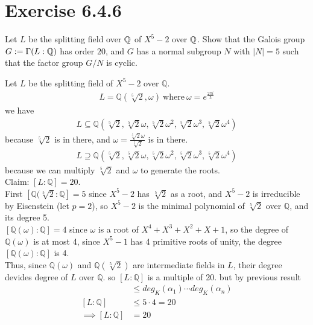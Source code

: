 \documentclass[12pt,english]{article}
\begin{document}
\section*{Exercise 6.4.6}
\begin{question}
    Let $L$ be the splitting field over $\mathbb{Q}$ of $X^5 - 2$ over $\mathbb{Q}$. 
    Show that the Galois group $G:=\Gamma(L:\mathbb{Q})$ has order $20$,
    and $G$ has a normal subgroup $N$ with $\lvert N \rvert = 5$
    such that the factor group $G/N$ is cyclic.
\end{question}

Let $L$ be the splitting field of $X^5 - 2$ over $\mathbb{Q}$.
\begin{align}
    L = \mathbb{Q}(\sqrt[5]{2}, \omega) \ \text{where} \ \omega = e^{\frac{ 2 \pi i }{5}}
\end{align}
we have
\begin{align}
    L \subseteq \mathbb{Q}(\sqrt[5]{2}, \sqrt[5]{2}\omega, \sqrt[5]{2}\omega^2, \sqrt[5]{2}\omega^3, \sqrt[5]{2} \omega^4)
\end{align}
because $\sqrt[5]{2}$ is in there, and $\omega = \frac{ \sqrt[5]{2} \omega }{ \sqrt[5]{2} }$ is in there.
\begin{align}
    L \supseteq \mathbb{Q}(\sqrt[5]{2}, \sqrt[5]{2}\omega, \sqrt[5]{2}\omega^2, \sqrt[5]{2}\omega^3, \sqrt[5]{2} \omega^4)
\end{align}
because we can multiply $\sqrt[5]{2}$ and $\omega$ to generate the roots.\\
Claim: $[L:\mathbb{Q}]=20$.\\
First $[\mathbb{Q}(\sqrt[5]{2}:\mathbb{Q}]=5$ since $X^5 - 2$ has $\sqrt[5]{2}$ as a root,
and $X^5 - 2$ is irreducible by Eisenstein (let $p=2$), so 
$X^5 - 2$ is the minimal polynomial of $\sqrt[5]{2}$ over $\mathbb{Q}$,
and its degree 5.\\
$[\mathbb{Q}(\omega):\mathbb{Q}]=4$ since $\omega$ is a root of 
$X^4 + X^3 + X^2 + X +1$,
so the degree of $\mathbb{Q}(\omega)$ is at most 4, since $X^5 - 1$ has 4
primitive roots of unity, the degree $[\mathbb{Q}(\omega):\mathbb{Q}]$ is 4.\\
Thus, since $\mathbb{Q}(\omega)$ and $\mathbb{Q}(\sqrt[5]{2})$
are intermediate fields in $L$,
their degree devides degree of $L$ over $\mathbb{Q}$.
so $[L:\mathbb{Q}]$ is a multiple of 20. but by previous result
\begin{align}
    [K(\alpha_1,\ldots, \alpha_n):K] &\leq deg_K(\alpha_1) \cdots deg_K (\alpha_n)\\
    [L:\mathbb{Q}] &\leq 5 \cdot 4 = 20\\
    \implies [L:\mathbb{Q}] &=20
\end{align}
\end{document}

